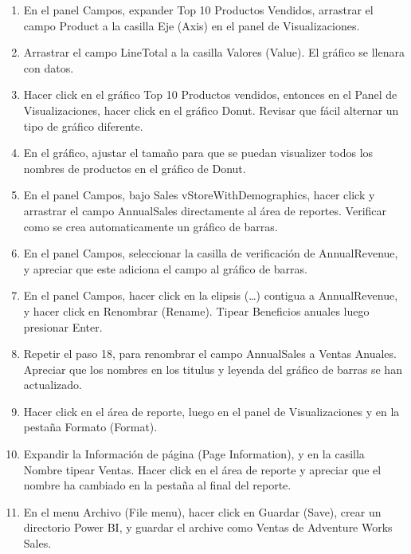 \begin{enumerate}[1.]
    \item  En el panel Campos, expander Top 10 Productos Vendidos, arrastrar el campo Product a la casilla Eje (Axis) en el panel de Visualizaciones.  
    
    \item  Arrastrar el campo LineTotal a la casilla Valores (Value). El gráfico se llenara con datos.
    
    \item  Hacer click en el gráfico Top 10 Productos vendidos, entonces en el Panel de Visualizaciones, hacer click en el gráfico Donut. Revisar que fácil alternar un tipo de gráfico diferente.
    
    \item  En el gráfico, ajustar el tamaño para que se puedan visualizer todos los nombres de productos en el gráfico de Donut.
    
    \item  En el panel Campos, bajo Sales vStoreWithDemographics, hacer click y arrastrar el campo AnnualSales directamente al área de reportes. Verificar como se crea automaticamente un gráfico de barras. 
    
    \item  En el panel Campos, seleccionar la casilla de verificación de AnnualRevenue, y apreciar que este adiciona el campo al gráfico de barras.
    
    \item  En el panel Campos, hacer click en la elipsis (…) contigua a AnnualRevenue, y hacer click en Renombrar (Rename). Tipear Beneficios anuales luego presionar Enter.
    
    \item  Repetir el paso 18, para renombrar el campo AnnualSales a Ventas Anuales. Apreciar que los nombres en los titulus y leyenda del gráfico de barras se han actualizado.
    
    \item  Hacer click en el área de reporte, luego en el panel de Visualizaciones y en la pestaña Formato (Format).
    
    \item  Expandir la Información de página (Page Information), y en la casilla Nombre tipear Ventas. Hacer click en el área de reporte y apreciar que el nombre ha cambiado en la pestaña al final del reporte.
    
    \item  En el menu Archivo (File menu), hacer click en Guardar (Save), crear un directorio Power BI, y guardar el archive como Ventas de Adventure Works Sales.
    
     
    
    
\end{enumerate}


